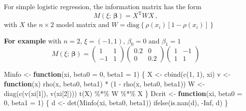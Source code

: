 \documentclass[
  ignorenonframetext,
]{beamer}
\newenvironment{Shaded}{\begin{snugshade}}{\end{snugshade}}
\newcommand{\AttributeTok}[1]{\textcolor[rgb]{0.77,0.63,0.00}{#1}}
\newcommand{\ConstantTok}[1]{\textcolor[rgb]{0.00,0.00,0.00}{#1}}
\newcommand{\ControlFlowTok}[1]{\textcolor[rgb]{0.13,0.29,0.53}{\textbf{#1}}}
\newcommand{\DecValTok}[1]{\textcolor[rgb]{0.00,0.00,0.81}{#1}}
\newcommand{\FunctionTok}[1]{\textcolor[rgb]{0.00,0.00,0.00}{#1}}
\newcommand{\NormalTok}[1]{#1}
\newcommand{\OtherTok}[1]{\textcolor[rgb]{0.56,0.35,0.01}{#1}}
\newcommand{\SpecialCharTok}[1]{\textcolor[rgb]{0.00,0.00,0.00}{#1}}
\begin{document}
\begin{frame}[fragile]{}
\protect\hypertarget{section-23}{}
For simple logistic regression, the information matrix has the form \[
M(\xi;\,\boldsymbol{\beta}) = X^\mathrm{T}W X\,,
\] with \(X\) the \(n\times 2\) model matrix and
\(W = \mbox{diag}\left\{\rho(x_i)[1-\rho(x_i)]\right\}\)

\textbf{For example} with \(n=2\), \(\xi = (-1, 1)\), \(\beta_0=0\) and
\(\beta_1 = 1\) \[
M(\xi;\,\boldsymbol{\beta}) = 
\left(
\begin{array}{cc}
1 & 1 \\
-1 & 1
\end{array}
\right)
\left(
\begin{array}{cc}
0.2 & 0 \\
0 & 0.2
\end{array}
\right)
\left(
\begin{array}{cc}
1 & -1 \\
1 & 1
\end{array}
\right)
\]

\begin{Shaded}
\begin{Highlighting}[]
\NormalTok{Minfo }\OtherTok{\textless{}{-}} \ControlFlowTok{function}\NormalTok{(xi, }\AttributeTok{beta0 =} \DecValTok{0}\NormalTok{, }\AttributeTok{beta1 =} \DecValTok{1}\NormalTok{) \{}
\NormalTok{  X }\OtherTok{\textless{}{-}} \FunctionTok{cbind}\NormalTok{(}\FunctionTok{c}\NormalTok{(}\DecValTok{1}\NormalTok{, }\DecValTok{1}\NormalTok{), xi)}
\NormalTok{  v }\OtherTok{\textless{}{-}} \ControlFlowTok{function}\NormalTok{(x) }\FunctionTok{rho}\NormalTok{(x, beta0, beta1) }\SpecialCharTok{*}\NormalTok{ (}\DecValTok{1} \SpecialCharTok{{-}} \FunctionTok{rho}\NormalTok{(x, beta0, beta1))}
\NormalTok{  W }\OtherTok{\textless{}{-}} \FunctionTok{diag}\NormalTok{(}\FunctionTok{c}\NormalTok{(}\FunctionTok{v}\NormalTok{(xi[}\DecValTok{1}\NormalTok{]), }\FunctionTok{v}\NormalTok{(xi[}\DecValTok{2}\NormalTok{])))}
  \FunctionTok{t}\NormalTok{(X) }\SpecialCharTok{\%*\%}\NormalTok{ W }\SpecialCharTok{\%*\%}\NormalTok{ X}
\NormalTok{\}}
\NormalTok{Dcrit }\OtherTok{\textless{}{-}} \ControlFlowTok{function}\NormalTok{(xi, }\AttributeTok{beta0 =} \DecValTok{0}\NormalTok{, }\AttributeTok{beta1 =} \DecValTok{1}\NormalTok{) \{}
\NormalTok{  d }\OtherTok{\textless{}{-}} \FunctionTok{det}\NormalTok{(}\FunctionTok{Minfo}\NormalTok{(xi, beta0, beta1))}
  \FunctionTok{ifelse}\NormalTok{(}\FunctionTok{is.nan}\NormalTok{(d), }\SpecialCharTok{{-}}\ConstantTok{Inf}\NormalTok{, d)}
\NormalTok{\}}
\end{Highlighting}
\end{Shaded}
\end{frame}
\end{document}

